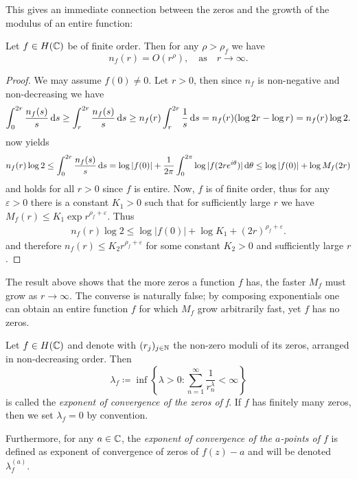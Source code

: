 This gives an immediate connection between the zeros and the growth of the modulus of an entire function:

\begin{proposition} \label{prop:zeros-bounded-by-order}
    Let $f \in H(\mathbb{C})$ be of finite order. Then for any $\rho > \rho_f$ we have
    $$ n_f(r) = O(r^{\rho}), \quad \textrm{as} \quad r \to \infty. $$
\end{proposition}

\begin{proof}
    We may assume $f(0) \neq 0$. Let $r > 0$, then since $n_f$ is non-negative and non-decreasing we have
    \begin{align*}
        \int_0^{2r} \frac{n_f(s)}{s} \mathop{}\!\mathrm{d} s \geq \int_r^{2r} \frac{n_f(s)}{s} \mathop{}\!\mathrm{d} s \geq n_f(r) \int_r^{2r} \frac{1}{s} \mathop{}\!\mathrm{d} s = n_f(r) (\log 2r - \log r) = n_f(r) \log 2.
    \end{align*}
     now yields
    \begin{equation*}
        n_f(r) \log 2 \leq \int_0^{2r} \frac{n_f(s)}{s} \mathop{}\!\mathrm{d} s = \log \vert f(0) \vert + \frac{1}{2\pi} \int_0^{2 \pi} \log \vert f(2r e^{i \theta}) \vert \mathop{}\!\mathrm{d} \theta \leq \log \vert f(0) \vert + \log M_f(2r)
    \end{equation*}
    and holds for all $r > 0$ since $f$ is entire. Now, $f$ is of finite order, thus for any $\varepsilon > 0$ there is a constant $K_1 > 0$ such that for sufficiently large $r$ we have $M_f(r) \leq K_1 \exp {r^{\rho_f + \varepsilon}}$. Thus
    \begin{align*}
        n_f(r) \log 2 \leq \log \vert f(0) \vert + \log K_1 + (2r)^{\rho_f + \varepsilon}.
    \end{align*}
    and therefore $n_f(r) \leq K_2 r^{\rho_f + \varepsilon}$ for some constant $K_2 > 0$ and sufficiently large $r$.
\end{proof}

The result above shows that the more zeros a function $f$ has, the faster $M_f$ must grow as $r \to \infty$. The converse is naturally false; by composing exponentials one can obtain an entire function $f$ for which $M_f$ grow arbitrarily fast, yet $f$ has no zeros.

\begin{definition} \label{def:zero-exponent}
    Let $f \in H(\mathbb{C})$ and denote with $(r_j)_{j \in \mathbb{N}}$ the non-zero moduli of its zeros, arranged in non-decreasing order. Then
    $$ \lambda_f \coloneqq \inf \left\{ \lambda > 0 : \sum_{n=1}^\infty \frac{1}{r^\lambda_n} < \infty \right\} $$
    is called the \emph{exponent of convergence of the zeros of f}. If $f$ has finitely many zeros, then we set $\lambda_f = 0$ by convention.

    Furthermore, for any $a \in \mathbb{C}$, the \emph{exponent of convergence of the $a$-points of $f$} is defined as exponent of convergence of zeros of $f(z) - a$ and will be denoted $\lambda_f^{(a)}$.
\end{definition}

